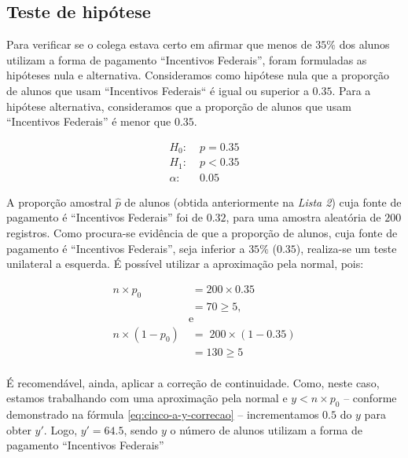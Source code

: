 \subsection{Teste de hipótese}
\label{questao:3a}
Para verificar se o colega estava certo em afirmar que menos de $35\%$ dos alunos utilizam a forma de pagamento ``Incentivos Federais'', 
foram formuladas as hipóteses nula e alternativa.
Consideramos como hipótese nula que a proporção de alunos que usam ``Incentivos Federais`` é igual ou superior a $0.35$. 
Para a hipótese alternativa, consideramos que a proporção de alunos que usam ``Incentivos Federais'' é menor que $0.35$.

\begin{align*}
  H_0\!:   &\; p = 0.35 \\
  H_1\!:   &\; p < 0.35  \\
   \alpha\!:&\; 0.05
\end{align*}

A proporção amostral $\hat{p}$ de alunos (obtida anteriormente na \textit{Lista 2}) cuja fonte de pagamento
é ``Incentivos Federais'' foi de $0.32$, para uma amostra aleatória de $200$ registros.
Como procura-se evidência de que a proporção de alunos, cuja fonte de pagamento é ``Incentivos Federais'', 
seja inferior a $35\%$ ($0.35$), realiza-se um teste unilateral a esquerda. É possível utilizar a aproximação pela normal, pois:

\begin{align*}
  n \times p_0\!  &\; = 200 \times 0.35 \\
  &\; = 70 \geq 5 ,\\
  & \text{e} \\
  n \times (1 - p_0)\!	&\;=\; 200 \times (1 - 0.35) \\
  &\;= 130  \geq 5 \\
\end{align*}

É recomendável, ainda, aplicar a correção de continuidade. 
Como, neste caso, estamos trabalhando com uma aproximação pela normal e  
$y < n \times p_0$ – conforme demonstrado na fórmula \ref{eq:cinco-a-y-correcao} – 
incrementamos $0.5$ do $y$ para obter $y'$. Logo, $y' = 64.5$, sendo $y$ o número de alunos utilizam a forma de pagamento ``Incentivos Federais'' 

